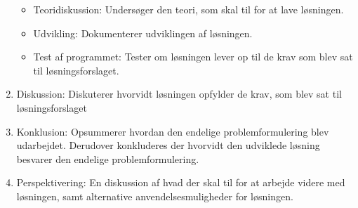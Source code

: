 \begin{enumerate}
  \begin{itemize}
    \item Teoridiskussion: Undersøger den teori, som skal til for at lave løsningen.
    \item Udvikling: Dokumenterer udviklingen af løsningen.
    \item Test af programmet: Tester om løsningen lever op til de krav som blev sat til løsningsforslaget.
  \end{itemize}
\item Diskussion: Diskuterer hvorvidt løsningen opfylder de krav, som blev sat til løsningsforslaget
\item Konklusion: Opsummerer hvordan den endelige problemformulering blev udarbejdet. Derudover konkluderes der hvorvidt den udviklede løsning besvarer den endelige problemformulering.
\item Perspektivering: En diskussion af hvad der skal til for at arbejde videre med løsningen, samt alternative anvendelsesmuligheder for løsningen.
\end{enumerate}

\clearpage